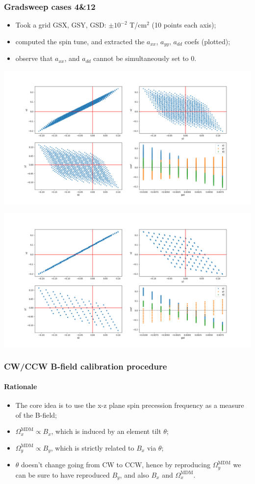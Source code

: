 \documentclass[pdf]{beamer}
\newcommand{\Wx}{\Omega_x}
\newcommand{\Wy}{\Omega_y}
\newcommand{\MDM}{^{\mathrm{MDM}}}
\begin{document}
	\begin{frame}\frametitle{Gradsweep cases 4\&12}
	\begin{minipage}{.3\textwidth}
		\begin{itemize}
			\item Took a grid GSX, GSY, GSD: $\pm 10^{-2}$ T/cm$^2$ (10 points each axis);
			\item computed the spin tune, and extracted the $a_{xx}$, $a_{yy}$, $a_{dd}$ coefs (plotted);
			\item observe that $a_{xx}$, and $a_{dd}$ cannot be simultaneously set to 0.
		\end{itemize}
	\end{minipage}
	\begin{minipage}{.65\textwidth}
		\centering
		\includegraphics[scale=.19]{decoh/gradsweep_4gsd}
		
		\includegraphics[scale=.19]{decoh/gradsweep_12gsd}
	\end{minipage}
	\end{frame}
	\begin{frame}
		\frametitle{CW/CCW B-field calibration procedure}
		\framesubtitle{Rationale}
		\begin{itemize}
			\item The core idea is to use the x-z plane spin precession frequency as a measure of the B-field;
			\item $\Wx\MDM \propto B_x$, which is induced by an element tilt $\theta$;
			\item $\Wy\MDM \propto B_y$, which is strictly related to $B_x$ via $\theta$;
			\item $\theta$ doesn't change going from CW to CCW, hence by reproducing $\Wy\MDM$ we can be sure to have reproduced $B_y$, and also $B_x$ and $\Wx\MDM$.
		\end{itemize}
	\end{frame}
\end{document}
